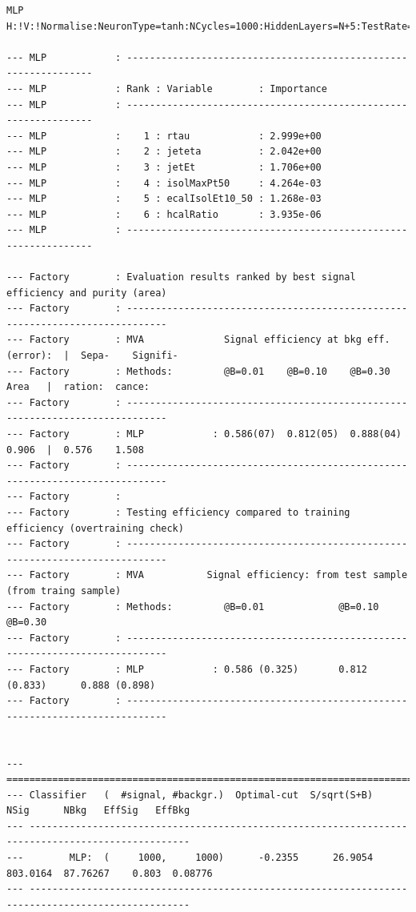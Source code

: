 \begin{verbatim}
MLP  H:!V:!Normalise:NeuronType=tanh:NCycles=1000:HiddenLayers=N+5:TestRate=5

--- MLP            : ----------------------------------------------------------------
--- MLP            : Rank : Variable        : Importance
--- MLP            : ----------------------------------------------------------------
--- MLP            :    1 : rtau            : 2.999e+00
--- MLP            :    2 : jeteta          : 2.042e+00
--- MLP            :    3 : jetEt           : 1.706e+00
--- MLP            :    4 : isolMaxPt50     : 4.264e-03
--- MLP            :    5 : ecalIsolEt10_50 : 1.268e-03
--- MLP            :    6 : hcalRatio       : 3.935e-06
--- MLP            : ----------------------------------------------------------------

--- Factory        : Evaluation results ranked by best signal efficiency and purity (area)
--- Factory        : -----------------------------------------------------------------------------
--- Factory        : MVA              Signal efficiency at bkg eff. (error):  |  Sepa-    Signifi-
--- Factory        : Methods:         @B=0.01    @B=0.10    @B=0.30    Area   |  ration:  cance:  
--- Factory        : -----------------------------------------------------------------------------
--- Factory        : MLP            : 0.586(07)  0.812(05)  0.888(04)  0.906  |  0.576    1.508
--- Factory        : -----------------------------------------------------------------------------
--- Factory        : 
--- Factory        : Testing efficiency compared to training efficiency (overtraining check)
--- Factory        : -----------------------------------------------------------------------------
--- Factory        : MVA           Signal efficiency: from test sample (from traing sample) 
--- Factory        : Methods:         @B=0.01             @B=0.10            @B=0.30   
--- Factory        : -----------------------------------------------------------------------------
--- Factory        : MLP            : 0.586 (0.325)       0.812 (0.833)      0.888 (0.898)
--- Factory        : -----------------------------------------------------------------------------


--- ==================================================================================================
--- Classifier   (  #signal, #backgr.)  Optimal-cut  S/sqrt(S+B)      NSig      NBkg   EffSig   EffBkg
--- --------------------------------------------------------------------------------------------------
---        MLP:  (     1000,     1000)      -0.2355      26.9054  803.0164  87.76267    0.803  0.08776
--- --------------------------------------------------------------------------------------------------


\end{verbatim}
